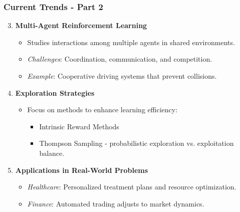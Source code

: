\documentclass[aspectratio=169]{beamer}
\begin{document}
\begin{frame}[fragile]
    \frametitle{Current Trends - Part 2}
    \begin{enumerate}
        \setcounter{enumi}{2}
        \item \textbf{Multi-Agent Reinforcement Learning}
            \begin{itemize}
                \item Studies interactions among multiple agents in shared environments.
                \item \textit{Challenges}: Coordination, communication, and competition.
                \item \textit{Example}: Cooperative driving systems that prevent collisions.
            \end{itemize}
        
        \item \textbf{Exploration Strategies}
            \begin{itemize}
                \item Focus on methods to enhance learning efficiency:
                    \begin{itemize}
                        \item Intrinsic Reward Methods 
                        \item Thompson Sampling - probabilistic exploration vs. exploitation balance.
                    \end{itemize}
            \end{itemize}
        
        \item \textbf{Applications in Real-World Problems}
            \begin{itemize}
                \item \textit{Healthcare}: Personalized treatment plans and resource optimization.
                \item \textit{Finance}: Automated trading adjusts to market dynamics.
            \end{itemize}
    \end{enumerate}
\end{frame}
\end{document}

